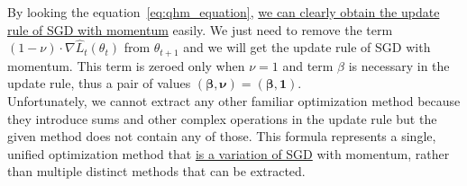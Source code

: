 By looking the equation~\ref{eq:qhm_equation}, \underline{we can clearly obtain the update rule of SGD with momentum} easily. We just need to remove the term $\left(1 -\nu \right) \cdot \nabla \hat{L}_{t}\left(\theta_{t}\right)$ from $\theta_{t+1}$ and we will get the update rule of SGD with momentum.
This term is zeroed only when $\nu = 1$ and term $\beta$ is necessary in the update rule, thus a pair of values $\mathbf{\left(\beta, \nu\right) = \left(\beta, 1\right)}$.\\

Unfortunately, we cannot extract any other familiar optimization method because they introduce sums and other complex operations in the update rule but the given method does not contain any of those. This formula represents a single, unified optimization method that \underline{is a variation of SGD} with momentum, rather than multiple distinct methods that can be extracted.
